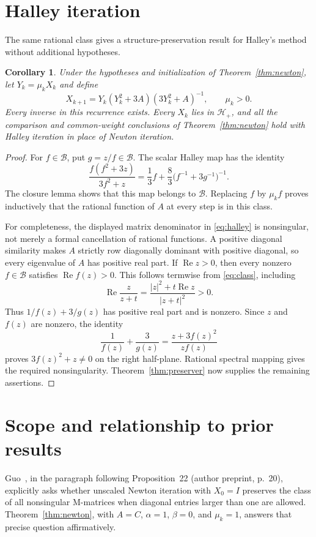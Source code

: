 \documentclass[11pt]{article}
\newtheorem{corollary}[theorem]{Corollary}
\begin{document}
\section{Halley iteration}
The same rational class gives a structure-preservation result for Halley's method without additional hypotheses.
\begin{corollary}\label{cor:halley}
Under the hypotheses and initialization of Theorem~\ref{thm:newton}, let $Y_k=\mu_kX_k$ and define
\begin{equation}\label{eq:halley}
X_{k+1}=Y_k(Y_k^2+3A)(3Y_k^2+A)^{-1},\qquad \mu_k>0.
\end{equation}
Every inverse in this recurrence exists. Every $X_k$ lies in $\mathcal H_+$, and all the comparison and common-weight conclusions of Theorem~\ref{thm:newton} hold with Halley iteration in place of Newton iteration.
\end{corollary}
\begin{proof}
For $f\in\mathcal B$, put $g=z/f\in\mathcal B$. The scalar Halley map has the identity
\[
\frac{f(f^2+3z)}{3f^2+z}
=\frac13f+\frac83\bigl(f^{-1}+3g^{-1}\bigr)^{-1}.
\]
The closure lemma shows that this map belongs to $\mathcal B$. Replacing $f$ by $\mu_k f$ proves inductively that the rational function of $A$ at every step is in this class.

For completeness, the displayed matrix denominator in \eqref{eq:halley} is nonsingular, not merely a formal cancellation of rational functions. A positive diagonal similarity makes $A$ strictly row diagonally dominant with positive diagonal, so every eigenvalue of $A$ has positive real part. If $\operatorname{Re}z>0$, then every nonzero $f\in\mathcal B$ satisfies $\operatorname{Re}f(z)>0$. This follows termwise from \eqref{eq:class}, including
\[
\operatorname{Re}\frac{z}{z+t}
=\frac{|z|^2+t\operatorname{Re}z}{|z+t|^2}>0.
\]
Thus $1/f(z)+3/g(z)$ has positive real part and is nonzero. Since $z$ and $f(z)$ are nonzero, the identity
\[
\frac{1}{f(z)}+\frac{3}{g(z)}=\frac{z+3f(z)^2}{zf(z)}
\]
proves $3f(z)^2+z\ne0$ on the right half-plane. Rational spectral mapping gives the required nonsingularity. Theorem~\ref{thm:preserver} now supplies the remaining assertions.
\end{proof}

\section{Scope and relationship to prior results}
Guo~\cite{G}, in the paragraph following Proposition~22 (author preprint, p.~20), explicitly asks whether unscaled Newton iteration with $X_0=I$ preserves the class of all nonsingular M-matrices when diagonal entries larger than one are allowed. Theorem~\ref{thm:newton}, with $A=C$, $\alpha=1$, $\beta=0$, and $\mu_k=1$, answers that precise question affirmatively.
\end{document}
